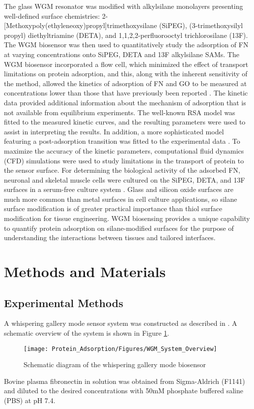 The glass WGM resonator was modified with alkylsilane monolayers presenting
well-defined surface chemistries: 2-{[}Methoxypoly(ethyleneoxy)propyl{]}trimethoxysilane
(SiPEG), (3-trimethoxysilyl propyl) diethyltriamine (DETA), and 1,1,2,2-perfluorooctyl
trichlorosilane (13F). The WGM biosensor was then used to quantitatively
study the adsorption of FN at varying concentrations onto SiPEG, DETA
and 13F alkylsilane SAMs. The WGM biosensor incorporated a flow cell,
which minimized the effect of transport limitations on protein adsorption,
and this, along with the inherent sensitivity of the method, allowed
the kinetics of adsorption of FN and GO to be measured at concentrations
lower than those that have previously been reported \cite{Michael2003}.
The kinetic data provided additional information about the mechanism
of adsorption that is not available from equilibrium experiments.
The well-known RSA model \cite{Schaaf1989} was fitted to the measured
kinetic curves, and the resulting parameters were used to assist in
interpreting the results. In addition, a more sophisticated model
featuring a post-adsorption transition was fitted to the experimental
data \cite{Brusatori1999,Tie2003}. To maximize the accuracy of the
kinetic parameters, computational fluid dynamics (CFD) simulations
were used to study limitations in the transport of protein to the
sensor surface. For determining the biological activity of the adsorbed
FN, neuronal and skeletal muscle cells were cultured on the SiPEG,
DETA, and 13F surfaces in a serum-free culture system \cite{Brewer1995,Das2007}.
Glass and silicon oxide surfaces are much more common than metal surfaces
in cell culture applications, so silane surface modification is of
greater practical importance than thiol surface modification for tissue
engineering. WGM biosensing provides a unique capability to quantify
protein adsorption on silane-modified surfaces for the purpose of
understanding the interactions between tissues and tailored interfaces. 


\section{Methods and Materials}


\subsection{Experimental Methods}

A whispering gallery mode sensor system was constructed as described
in \cite{Wilson2011,Wilson2009}. A schematic overview of the system
is shown in Figure \ref{fig:WGM System Diagram}.%
\begin{figure}
\texttt{[image: Protein\_Adsorption/Figures/WGM\_System\_Overview]}

\caption{\label{fig:WGM System Diagram}Schematic diagram of the whispering
gallery mode biosensor}


%
\end{figure}
 Bovine plasma fibronectin in solution was obtained from Sigma-Aldrich
(F1141) and diluted to the desired concentrations with 50mM phosphate
buffered saline (PBS) at pH 7.4.


